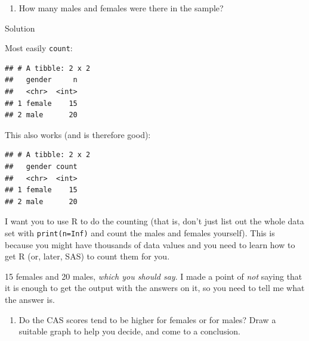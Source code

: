 \documentclass[]{tufte-book}
\newenvironment{Shaded}{}{}
\newcommand{\DataTypeTok}[1]{\textcolor[rgb]{0.56,0.13,0.00}{#1}}
\newcommand{\KeywordTok}[1]{\textcolor[rgb]{0.00,0.44,0.13}{\textbf{#1}}}
\newcommand{\NormalTok}[1]{#1}
\newcommand{\OperatorTok}[1]{\textcolor[rgb]{0.40,0.40,0.40}{#1}}
\newcommand{\StringTok}[1]{\textcolor[rgb]{0.25,0.44,0.63}{#1}}
\providecommand{\tightlist}{%
  \setlength{\itemsep}{0pt}\setlength{\parskip}{0pt}}
\theoremstyle{definition}
\theoremstyle{definition}
\theoremstyle{definition}
\theoremstyle{remark}
\begin{document}
\begin{enumerate}
\def\labelenumi{(\alph{enumi})}
\setcounter{enumi}{1}
\tightlist
\item
  How many males and females were there in the sample?
\end{enumerate}

Solution

Most easily \texttt{count}:

\begin{Shaded}
\end{Shaded}

\begin{verbatim}
## # A tibble: 2 x 2
##   gender     n
##   <chr>  <int>
## 1 female    15
## 2 male      20
\end{verbatim}

This also works (and is therefore good):

\begin{Shaded}
\end{Shaded}

\begin{verbatim}
## # A tibble: 2 x 2
##   gender count
##   <chr>  <int>
## 1 female    15
## 2 male      20
\end{verbatim}

I want you to use R to do the counting (that is, don't just list out the
whole data set with \texttt{print(n=Inf)} and count the males and
females yourself). This is because you might have thousands of data
values and you need to learn how to get R (or, later, SAS) to count them
for you.

15 females and 20 males, \emph{which you should say}. I made a point of
\emph{not} saying that it is enough to get the output with the answers
on it, so you need to tell me what the answer is.

\begin{enumerate}
\def\labelenumi{(\alph{enumi})}
\setcounter{enumi}{2}
\tightlist
\item
  Do the CAS scores tend to be higher for females or for males? Draw a
  suitable graph to help you decide, and come to a conclusion.
\end{enumerate}
\end{document}
